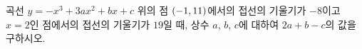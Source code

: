 곡선 $y=-x^3+3ax^2+bx+c$ 위의 점 $(-1{,}\mkern3mu\mathopen{}11)$에서의 접선의 기울기가 $-8$이고 $x=2$인 점에서의 접선의 기울기가 $19$일 때, 상수 $a$, $b$, $c$에 대하여 $2a+b-c$의 값을 구하시오.
